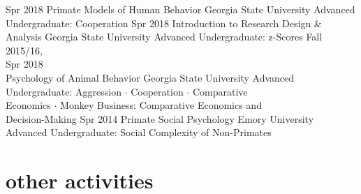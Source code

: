 \documentclass[]{friggeri-cv}
\begin{document}
\begin{entrylist}
  \entry
    {Spr 2018}
    {Primate Models of Human Behavior}
    {Georgia State University}
    {Advanced Undergraduate: Cooperation}
  \entry
    {Spr 2018}
    {Introduction to Research Design \& Analysis}
    {Georgia State University}
    {Advanced Undergraduate: z-Scores}
  \entry
    {Fall 2015/16,\\Spr 2018\\[-.85cm]}
    {Psychology of Animal Behavior}
    {Georgia State University}
    {Advanced Undergraduate: Aggression $\cdot$ Cooperation $\cdot$ Comparative \\
    Economics $\cdot$ Monkey Business: Comparative Economics and \\
    Decision-Making}
  \entry
    {Spr 2014}
    {Primate Social Psychology}
    {Emory University}
    {Advanced Undergraduate: Social Complexity of Non-Primates}
\end{entrylist}



\section{other activities}
\end{document}
